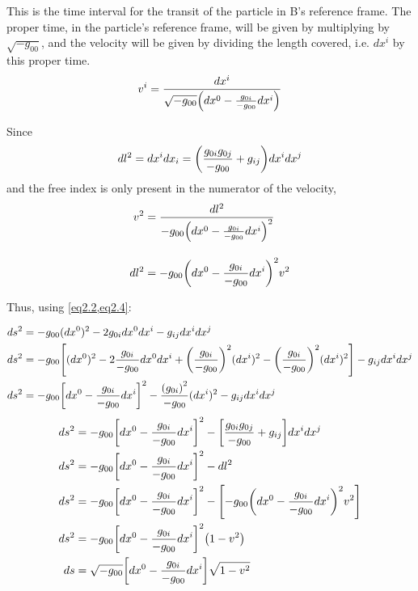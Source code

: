 \documentclass[12pt, letterpaper]{report}
\begin{document}
This is the time interval for the transit of the particle in B's reference frame. The proper time, in the particle's reference frame, will be given by multiplying by $\sqrt{-g_{00}}$, and the velocity will be given by dividing the length covered, i.e. $dx^i$ by this proper time. 
$$v^i= \frac{dx^i}{\sqrt{-g_{00}}\qty(dx^0-\frac{g_{0i}}{-g_{00}}dx^i)}$$

Since \[dl^2=dx^i dx_i= \qty(\frac{g_{0i}g_{0j}}{-g_{00}}+g_{ij})dx^idx^j\] and the free index is only present in the numerator of the velocity, 
\begin{align}
    v^2&= \frac{dl^2}{-g_{00}\qty(dx^0-\frac{g_{0i}}{-g_{00}}dx^i)^2}\nonumber\\[10pt]
    dl^2&= {-g_{00}\qty(dx^0-\frac{g_{0i}}{-g_{00}}dx^i)^2}v^2 \label{eq2.4}
\end{align}

Thus, using \cref{eq2.2,eq2.4}:

\begin{align*}
    ds^2&= -g_{00}(dx^0)^2-2{g_{0i}}dx^0dx^i-g_{ij}dx^idx^j\\
    ds^2&= -g_{00}\qty[(dx^0)^2-2\frac{g_{0i}}{-g_{00}}dx^0dx^i+\qty(\frac{g_{0i}}{-g_{00}})^2(dx^i)^2-\qty(\frac{g_{0i}}{-g_{00}})^2(dx^i)^2]-g_{ij}dx^idx^j\\
    ds^2&= -g_{00}\qty[dx^0-\frac{g_{0i}}{-g_{00}}dx^i]^2-\frac{\qty(g_{0i})^2}{-g_{00}}(dx^i)^2-g_{ij}dx^idx^j\\
\end{align*}
\begin{align*}
    ds^2&= -g_{00}\qty[dx^0-\frac{g_{0i}}{-g_{00}}dx^i]^2-\qty[\frac{g_{0i}g_{0j}}{-g_{00}}+g_{ij}]dx^idx^j\\
    ds^2&= -g_{00}\qty[dx^0-\frac{g_{0i}}{-g_{00}}dx^i]^2-dl^2\\
    ds^2&= -g_{00}\qty[dx^0-\frac{g_{0i}}{-g_{00}}dx^i]^2-\qty[{-g_{00}\qty(dx^0-\frac{g_{0i}}{-g_{00}}dx^i)^2}v^2]\\
    ds^2&= -g_{00}\qty[dx^0-\frac{g_{0i}}{-g_{00}}dx^i]^2\qty(1-v^2)\\
    ds&= \sqrt{-g_{00}}\qty[dx^0-\frac{g_{0i}}{-g_{00}}dx^i]\sqrt{1-v^2}
\end{align*}
\end{document}

